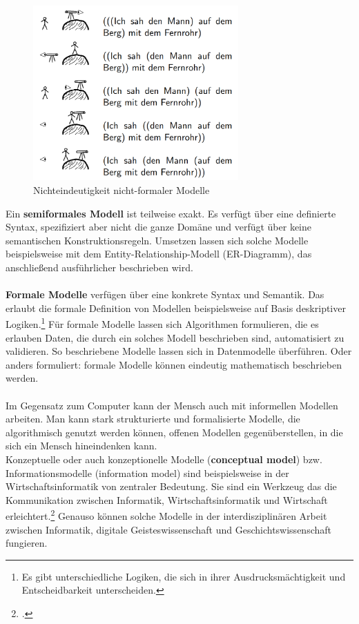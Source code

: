 \documentclass[12pt,a4paper]{article}
\begin{document}
\begin{figure}[H]
\centering
	\includegraphics[width=0.7\textwidth]{img/fernrohr.png}  
    \caption[Nichteindeutigkeit nicht-formaler Modelle, KÖNIG Bettina: Vorlesung ''Modellierungsmethoden der Informatik'', ti.inf.uni-due.de 10.06.2019]{Nichteindeutigkeit nicht-formaler Modelle}\label{fig:fernrohr}
\end{figure} 
Ein \textbf{semiformales Modell} ist teilweise exakt. Es verfügt über eine definierte Syntax, spezifiziert aber nicht die ganze Domäne und verfügt über keine semantischen Konstruktionsregeln. Umsetzen lassen sich solche Modelle beispielsweise mit dem Entity-Relationship-Modell (ER-Diagramm), das anschließend ausführlicher beschrieben wird.
\\
\\
\textbf{Formale Modelle} verfügen über eine konkrete Syntax und Semantik. Das erlaubt die formale Definition von Modellen beispielsweise auf Basis deskriptiver Logiken.\footnote{Es gibt unterschiedliche Logiken, die sich in ihrer Ausdrucksmächtigkeit und Entscheidbarkeit unterscheiden.} Für formale Modelle lassen sich Algorithmen formulieren, die es erlauben Daten, die durch ein solches Modell beschrieben sind, automatisiert zu validieren. So beschriebene Modelle lassen sich in Datenmodelle überführen. Oder anders formuliert: formale Modelle können eindeutig mathematisch beschrieben werden.
\\
\\
Im Gegensatz zum Computer kann der Mensch auch mit informellen Modellen arbeiten. Man kann stark strukturierte und formalisierte Modelle, die algorithmisch genutzt werden können, offenen Modellen gegenüberstellen, in die sich ein Mensch hineindenken kann.
\\
Konzeptuelle oder auch konzeptionelle Modelle (\textbf{conceptual model}) bzw. Informationsmodelle (information model) sind beispielsweise in der Wirtschaftsinformatik von zentraler Bedeutung. Sie sind ein Werkzeug das die Kommunikation zwischen Informatik, Wirtschaftsinformatik und Wirtschaft erleichtert.\footcite[][S.44-47]{kobler2010qualitat} Genauso können solche Modelle in der interdisziplinären Arbeit zwischen Informatik, digitale Geisteswissenschaft und Geschichtswissenschaft fungieren.
\end{document}
